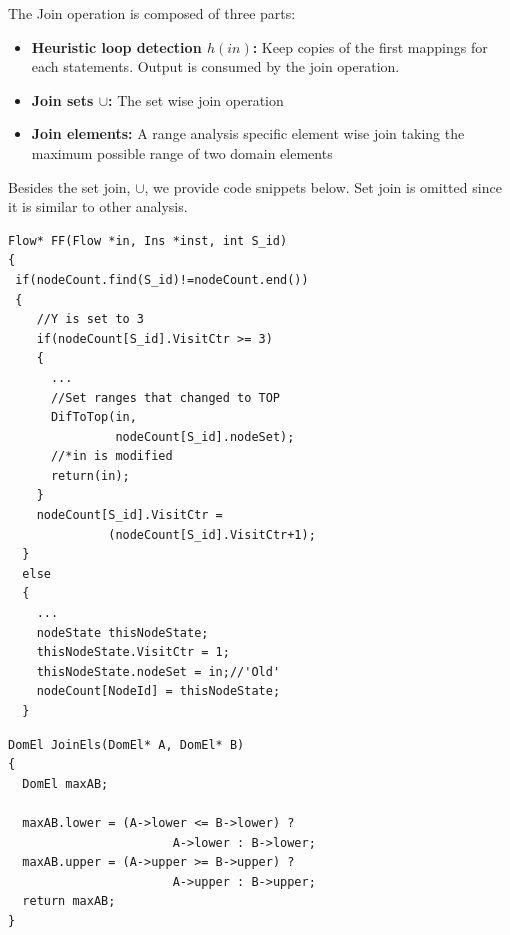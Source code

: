 The Join operation is composed of three parts:
\begin{itemize}
\item{\textbf{Heuristic loop detection $h(in)$: }Keep copies of the first mappings for each statements. Output is consumed by the join operation.}
\item{\textbf{Join sets $\cup$: }The set wise join operation}
\item{\textbf{Join elements: }A range analysis specific element wise join taking the maximum possible range of two domain elements}
\end{itemize}

Besides the set join, $\cup$, we provide code snippets below. Set join is omitted since it is similar to other analysis.\\


 \begin{lstlisting}[caption=Heuristic loop detector $h(in)$, label=PAFF]
Flow* FF(Flow *in, Ins *inst, int S_id) 
{
 if(nodeCount.find(S_id)!=nodeCount.end())
 {
    //Y is set to 3
    if(nodeCount[S_id].VisitCtr >= 3)
    {
      ...
      //Set ranges that changed to TOP
      DifToTop(in, 
               nodeCount[S_id].nodeSet);
      //*in is modified
      return(in);
    }
    nodeCount[S_id].VisitCtr = 
              (nodeCount[S_id].VisitCtr+1);
  }
  else
  {
    ...
    nodeState thisNodeState;
	thisNodeState.VisitCtr = 1;
	thisNodeState.nodeSet = in;//'Old'
	nodeCount[NodeId] = thisNodeState;
  }

 \end{lstlisting}
 
 \begin{lstlisting}[caption=Per domain element join, label=PAFF]
DomEl JoinEls(DomEl* A, DomEl* B)
{
  DomEl maxAB;

  maxAB.lower = (A->lower <= B->lower) ? 
                       A->lower : B->lower;
  maxAB.upper = (A->upper >= B->upper) ? 
                       A->upper : B->upper;
  return maxAB;
}
 \end{lstlisting}